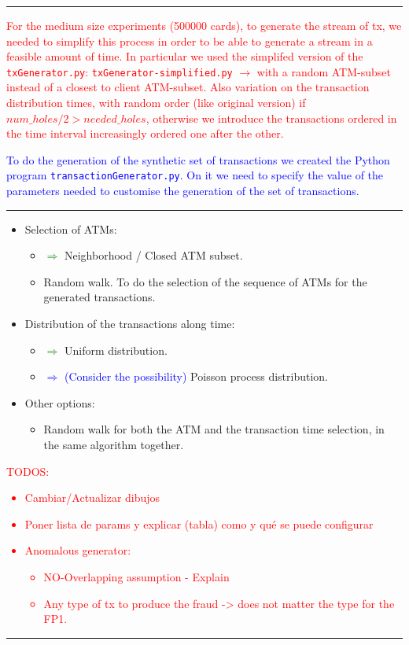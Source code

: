 \textcolor{red}{\rule{\linewidth}{0.5mm}}
\textcolor{red}{For the medium size experiments (500000 cards), to generate the stream of tx, we needed to simplify this process in order to be able to generate a stream in a feasible amount of time. In particular we used the simplifed version of the \texttt{txGenerator.py}: \texttt{txGenerator-simplified.py} $\rightarrow$ with a random ATM-subset instead of a closest to client ATM-subset. Also variation on the transaction distribution times, with random order (like original version) if $num\_holes / 2 > needed\_holes$, otherwise we introduce the transactions ordered in the time interval increasingly ordered one after the other.}

\textcolor{blue}{To do the generation of the synthetic set of transactions we created the Python program \texttt{transactionGenerator.py}. On it we need to specify the value of the parameters needed to customise the generation of the set of transactions.}

\textcolor{red}{\rule{\linewidth}{0.5mm}}
\begin{itemize}
  \item Selection of ATMs:
  \begin{itemize}
    \item \textcolor{green}{$\Rightarrow$} Neighborhood / Closed ATM subset.
    \item Random walk. To do the selection of the sequence of ATMs for the generated transactions.
  \end{itemize}
  \item Distribution of the transactions along time:
  \begin{itemize}
    \item \textcolor{green}{$\Rightarrow$} Uniform distribution.
    \item \textcolor{blue}{$\Rightarrow$ (Consider the possibility)} Poisson process distribution.
  \end{itemize}
  \item Other options:
  \begin{itemize}
    \item Random walk for both the ATM and the transaction time selection, in the same algorithm together.
  \end{itemize}
\end{itemize}

\textcolor{red}{TODOS:
\begin{itemize}
\item Cambiar/Actualizar dibujos
\item Poner lista de params y explicar (tabla) como y qué se puede configurar
\item Anomalous generator:
\begin{itemize}
  \item NO-Overlapping assumption - Explain
  \item Any type of tx to produce the fraud -> does not matter the type for the FP1.
\end{itemize}
\end{itemize}
}
\textcolor{red}{\rule{\linewidth}{0.5mm}}

